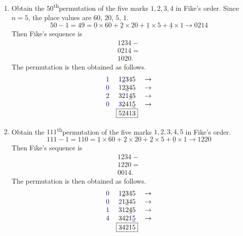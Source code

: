 \documentclass[svgnames]{article}
\renewcommand{\th}{\textsuperscript{th}}
\begin{document}
\begin{enumerate}
\item Obtain the $50$\th permutation of the five marks $1, 2, 3, 4$ in Fike's order.
Since $n = 5$, the place values are $60$, $20$, $5$, $1$.
\begin{equation*}
50 - 1 = 49 = \underline 0 \times 60 + \underline 2 \times 20 + \underline 1 \times 5 + \underline 4 \times 1 \to 0214
\end{equation*}
Then Fike's sequence is
\begin{equation*}
\begin{array}{l}
1234 - {}\\
0214 = {}\\
\hline
1020.
\end{array}
\end{equation*}
The permutation is then obtained as follows.
\begin{equation*}
\begin{array}{rcr}
\textcolor{blue!50!black}{1} & 1 \textcolor{blue!50!black}{\underline 2}345 & \to\\
\textcolor{blue!50!black}{0} & \textcolor{blue!50!black}{1}2\underline 345 & \to\\
\textcolor{blue!50!black}{2} & 32\textcolor{blue!50!black}{1}\underline 45 & \to\\
\textcolor{blue!50!black}{0} & \textcolor{blue!50!black}{3}241\underline 5 & \to\\
 & \boxed{52413} &
\end{array}
\end{equation*}

\item Obtain the $111$\th permutation of the five marks $1, 2, 3, 4, 5$ in Fike's order.
\begin{equation*}
111 - 1 = 110 = \underline 1 \times 60 + \underline 2 \times 20 + \underline 2 \times 5 + \underline 0 \times 1 \to 1220
\end{equation*}
Then Fike's sequence is
\begin{equation*}
\begin{array}{l}
1234 - {}\\
1220 = {}\\
\hline
0014.
\end{array}
\end{equation*}
The permutation is then obtained as follows.
\begin{equation*}
\begin{array}{rcr}
\textcolor{blue!50!black}{0} & \textcolor{blue!50!black}{1}\underline 2345 & \to\\
\textcolor{blue!50!black}{0} & \textcolor{blue!50!black}{2}1\underline 345 & \to\\
\textcolor{blue!50!black}{1} & 3\textcolor{blue!50!black}{1}2\underline 45 & \to\\
\textcolor{blue!50!black}{4} & 3421\textcolor{blue!50!black}{\underline 5} & \to\\
 & \boxed{34215} &
\end{array}
\end{equation*}
\end{enumerate}
\end{document}
